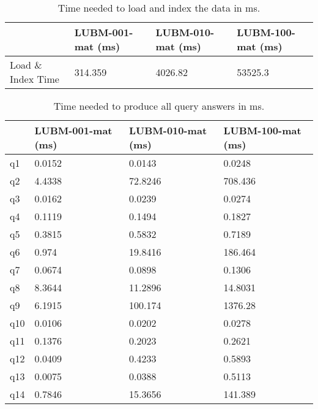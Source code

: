 \documentclass{article}
\begin{document}
\begin{enumerate}
\begin{table}[H]\centering
\begin{tabular}{|l|l|l|l|}
\hline
                   & LUBM-001-mat (ms) & LUBM-010-mat (ms) & LUBM-100-mat (ms)\\ \hline
Load \& Index Time & 314.359         & 4026.82        & 53525.3        \\ \hline
\end{tabular}
\caption{Time needed to load and index the data in ms.}
\end{table}


\begin{table}[H]\centering
\begin{tabular}{|l|l|l|l|}
\hline
    & LUBM-001-mat (ms) & LUBM-010-mat (ms) & LUBM-100-mat (ms) \\ \hline
q1  & 0.0152            & 0.0143            & 0.0248            \\ \hline
q2  & 4.4338            & 72.8246           & 708.436           \\ \hline
q3  & 0.0162            & 0.0239            & 0.0274            \\ \hline
q4  & 0.1119            & 0.1494            & 0.1827            \\ \hline
q5  & 0.3815            & 0.5832            & 0.7189            \\ \hline
q6  & 0.974             & 19.8416           & 186.464           \\ \hline
q7  & 0.0674            & 0.0898            & 0.1306            \\ \hline
q8  & 8.3644            & 11.2896           & 14.8031           \\ \hline
q9  & 6.1915            & 100.174           & 1376.28           \\ \hline
q10 & 0.0106            & 0.0202            & 0.0278            \\ \hline
q11 & 0.1376            & 0.2023            & 0.2621            \\ \hline
q12 & 0.0409            & 0.4233            & 0.5893            \\ \hline
q13 & 0.0075            & 0.0388            & 0.5113            \\ \hline
q14 & 0.7846            & 15.3656           & 141.389           \\ \hline
\end{tabular}
\caption{Time needed to produce  all query answers in ms.}
\end{table}


\end{enumerate}
\end{document}
